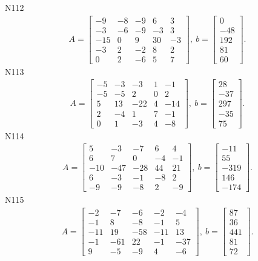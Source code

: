 \documentclass[11pt]{report}
\begin{document}
N112
\begin{align*}
 A = \left[\begin{matrix}-9 & -8 & -9 & 6 & 3\\-3 & -6 & -9 & -3 & 3\\-15 & 0 & 9 & 30 & -3\\-3 & 2 & -2 & 8 & 2\\0 & 2 & -6 & 5 & 7\end{matrix}\right],
\ b = \left[\begin{matrix}0\\-48\\192\\81\\60\end{matrix}\right]. 
 \end{align*}
N113
\begin{align*}
 A = \left[\begin{matrix}-5 & -3 & -3 & 1 & -1\\-5 & -5 & 2 & 0 & 2\\5 & 13 & -22 & 4 & -14\\2 & -4 & 1 & 7 & -1\\0 & 1 & -3 & 4 & -8\end{matrix}\right],
\ b = \left[\begin{matrix}28\\-37\\297\\-35\\75\end{matrix}\right]. 
 \end{align*}
N114
\begin{align*}
 A = \left[\begin{matrix}5 & -3 & -7 & 6 & 4\\6 & 7 & 0 & -4 & -1\\-10 & -47 & -28 & 44 & 21\\6 & -3 & -1 & -8 & 2\\-9 & -9 & -8 & 2 & -9\end{matrix}\right],
\ b = \left[\begin{matrix}-11\\55\\-319\\146\\-174\end{matrix}\right]. 
 \end{align*}
N115
\begin{align*}
 A = \left[\begin{matrix}-2 & -7 & -6 & -2 & -4\\-1 & 8 & -8 & -1 & 5\\-11 & 19 & -58 & -11 & 13\\-1 & -61 & 22 & -1 & -37\\9 & -5 & -9 & 4 & -6\end{matrix}\right],
\ b = \left[\begin{matrix}87\\36\\441\\81\\72\end{matrix}\right]. 
 \end{align*}
\end{document}
